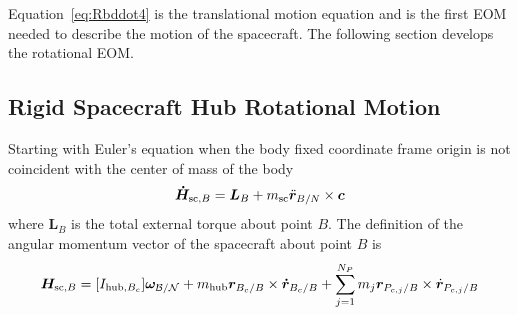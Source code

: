 \documentclass[]{BasiliskReportMemo}
\begin{document}
	Equation~\eqref{eq:Rbddot4} is the translational motion equation and is the first EOM needed to describe the motion of the spacecraft. The following section develops the rotational EOM.
	
	\subsection{Rigid Spacecraft Hub Rotational Motion}
	
	Starting with Euler's equation when the body fixed coordinate frame origin is not coincident with the center of mass of the body
	\begin{equation}
	\bm{\dot{H}}_{\text{sc},B} = \bm{L}_B+m_{\text{\text{sc}}}\ddot{\bm r}_{B/N}\times\bm{c}
	\label{eq:Euler}
	\end{equation}
	where $\bm{L}_B$ is the total external torque about point $B$. The definition of the angular momentum vector of the spacecraft about point $B$ is
	\begin{equation}
	\bm{H}_{\text{sc},B} = [I_{\text{hub},B_c}] \bm\omega_{\cal B/N} + m_{\text{hub}} \bm{r}_{B_c/B}\times\bm{\dot{r}}_{B_c/B} + \sum\limits_{j=1}^{N_P}m_j \bm r_{P_{c,j}/B}\times \dot{\bm r}_{P_{c,j}/B}
	\label{eq:Hb2}
	\end{equation}
	
\end{document}
